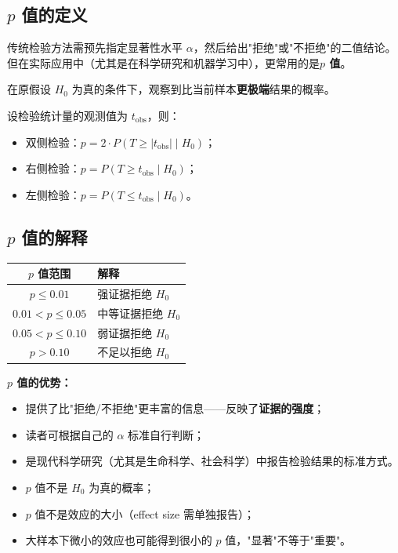 \subsection{$p$ 值的定义}

传统检验方法需预先指定显著性水平 $\alpha$，然后给出"拒绝"或"不拒绝"的二值结论。但在实际应用中（尤其是在科学研究和机器学习中），更常用的是\textbf{$p$ 值}。

\begin{definition}[$p$ 值]
在原假设 $H_0$ 为真的条件下，观察到比当前样本\textbf{更极端}结果的概率。
\end{definition}

设检验统计量的观测值为 $t_{\text{obs}}$，则：
\begin{itemize}
    \item 双侧检验：$p = 2 \cdot P(T \ge |t_{\text{obs}}| \mid H_0)$；
    \item 右侧检验：$p = P(T \ge t_{\text{obs}} \mid H_0)$；
    \item 左侧检验：$p = P(T \le t_{\text{obs}} \mid H_0)$。
\end{itemize}

\subsection{$p$ 值的解释}

\begin{center}
\begin{tabular}{c|l}
    \toprule
    $p$ 值范围 & 解释 \\
    \midrule
    $p \le 0.01$ & 强证据拒绝 $H_0$ \\
    $0.01 < p \le 0.05$ & 中等证据拒绝 $H_0$ \\
    $0.05 < p \le 0.10$ & 弱证据拒绝 $H_0$ \\
    $p > 0.10$ & 不足以拒绝 $H_0$ \\
    \bottomrule
\end{tabular}
\end{center}

\textbf{$p$ 值的优势：}
\begin{itemize}
    \item 提供了比"拒绝/不拒绝"更丰富的信息——反映了\textbf{证据的强度}；
    \item 读者可根据自己的 $\alpha$ 标准自行判断；
    \item 是现代科学研究（尤其是生命科学、社会科学）中报告检验结果的标准方式。
\end{itemize}

\begin{remark}[关于 $p$ 值的常见误解]
\begin{itemize}
    \item $p$ 值不是 $H_0$ 为真的概率；
    \item $p$ 值不是效应的大小（effect size 需单独报告）；
    \item 大样本下微小的效应也可能得到很小的 $p$ 值，"显著"不等于"重要"。
\end{itemize}
\end{remark}

